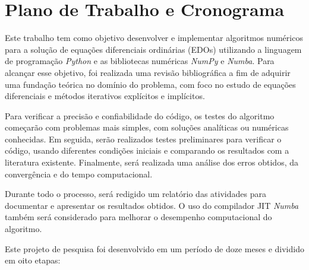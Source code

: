 \section{Plano de Trabalho e Cronograma}\label{sec:cronograma}

Este trabalho tem como objetivo desenvolver e implementar algoritmos numéricos para a solução de equações diferenciais ordinárias (EDOs) utilizando a linguagem de programação \emph{Python} e as bibliotecas numéricas \emph{NumPy} e \emph{Numba}. Para alcançar esse objetivo, foi realizada uma revisão bibliográfica a fim de adquirir uma fundação teórica no domínio do problema, com foco no estudo de equações diferenciais e métodos iterativos explícitos e implícitos.

Para verificar a precisão e confiabilidade do código, os testes do algoritmo começarão com problemas mais simples, com soluções analíticas ou numéricas conhecidas. Em seguida, serão realizados testes preliminares para verificar o código, usando diferentes condições iniciais e comparando os resultados com a literatura existente. Finalmente, será realizada uma análise dos erros obtidos, da convergência e do tempo computacional.

Durante todo o processo, será redigido um relatório das atividades para documentar e apresentar os resultados obtidos. O uso do compilador JIT \emph{Numba} também será considerado para melhorar o desempenho computacional do algoritmo.

Este projeto de pesquisa foi desenvolvido em um período de doze meses e dividido em oito etapas:

